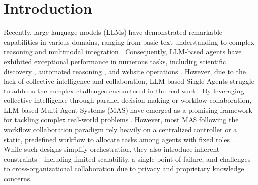 \documentclass{article}
\begin{document}
\section{Introduction}




Recently, large language models (LLMs) have demonstrated remarkable capabilities in various domains, ranging from basic text understanding to complex reasoning and multimodal integration \citep{openai2024gpt4technicalreport, touvron2023llama2openfoundation, yang2025whosmvpgametheoreticevaluation}.  Consequently, LLM-based agents have exhibited exceptional performance in numerous tasks, including scientific discovery \citep{gottweis2025aicoscientist}, automated reasoning \citep{putta2024agentqadvancedreasoning}, and website operations \citep{zhou2024tradenhancingllmagents}. However, due to the lack of collective intelligence and collaboration, LLM-based Single Agents struggle to address the complex challenges encountered in the real world. 
By leveraging collective intelligence through parallel decision-making or workflow collaboration, LLM-based Multi-Agent Systems (MAS) have emerged as a promising framework for tackling complex real-world problems \citep{Guo2024LargeLM, Sun2024LLMbasedMR, yang2024llmbasedmultiagentsystemstechniques}. However, most MAS following the workflow collaboration paradigm rely heavily on a centralized controller or a static, predefined workflow to allocate tasks among agents with fixed roles \citep{chen2023auto,hong2024metagptmetaprogrammingmultiagent,wu2023autogenenablingnextgenllm,wang2024megaagent, ye2025masgpttrainingllmsbuild}. While such designs simplify orchestration, they also introduce inherent constraints—including limited scalability, a single point of failure, and challenges to cross-organizational collaboration due to privacy and proprietary knowledge concerns.
\end{document}
